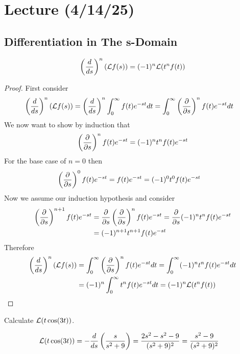 \documentclass[notes]{subfiles}
\begin{document}
\setcounter{section}{18}
\section{Lecture (4/14/25)}

\subsection{Differentiation in The s-Domain}
\begin{theorem}
    \[
        \left( \frac{d}{ds} \right)^n (\mathcal{L} f(s)) = (-1)^n\mathcal{L}(t^n f(t))
    \]
\end{theorem}
\begin{proof}
    First consider
    \begin{align*}
        \left( \frac{d}{ds} \right)^n (\mathcal{L} f(s))
        &= \left( \frac{d}{ds} \right)^n \int_0^\infty f(t)e^{-st}dt
        = \int_0^\infty \left( \frac{\partial}{\partial s} \right)^n f(t)e^{-st}dt
    \end{align*}
    We now want to show by induction that
    \[
        \left( \frac{\partial}{\partial s} \right)^n f(t)e^{-st} = (-1)^n t^n f(t)e^{-st}
    \]
    For the base case of $n = 0$ then
    \begin{align*}
        \left( \frac{\partial}{\partial s} \right)^0 f(t)e^{-st}
        &= f(t)e^{-st}
        = (-1)^0 t^0 f(t)e^{-st}
    \end{align*}
    Now we assume our induction hypothesis and consider
    \begin{align*}
        \left( \frac{\partial}{\partial s} \right)^{n + 1} f(t)e^{-st}
        &= \frac{\partial}{\partial s} \left( \frac{\partial}{\partial s} \right)^n f(t)e^{-st}
        = \frac{\partial}{\partial s} (-1)^n t^n f(t)e^{-st} \\
        &= (-1)^{n + 1} t^{n + 1} f(t)e^{-st}
    \end{align*}
    Therefore
    \begin{align*}
        \left( \frac{d}{ds} \right)^n (\mathcal{L} f(s))
        &= \int_0^\infty \left( \frac{\partial}{\partial s} \right)^n f(t)e^{-st}dt
        = \int_0^\infty (-1)^n t^n f(t)e^{-st}dt \\
        &= (-1)^n \int_0^\infty t^n f(t)e^{-st}dt
        = (-1)^n \mathcal{L}(t^n f(t))
    \end{align*}
\end{proof}

\begin{exercise}
    Calculate $\mathcal{L}(t\cos(3t))$.
\end{exercise}
\begin{solution}
    \begin{align*}
        \mathcal{L}(t\cos(3t))
        &= -\frac{d}{ds} \left(\frac{s}{s^2 + 9}\right)
        = \frac{2s^2 - s^2 - 9}{(s^2 + 9)^2}
        = \frac{s^2 - 9}{(s^2 + 9)^2}
    \end{align*}
\end{solution}
\end{document}
